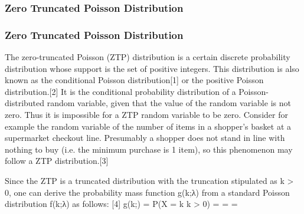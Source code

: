 \begin{frame}
\frametitle{Zero Truncated Poisson Distribution}
\Large


\end{frame}
\begin{frame}
\frametitle{Zero Truncated Poisson Distribution}
\Large

The zero-truncated Poisson (ZTP) distribution is a certain discrete probability distribution whose support is the set of positive integers. This distribution is also known as the conditional Poisson distribution[1] or the positive Poisson distribution.[2] It is the conditional probability distribution of a Poisson-distributed random variable, given that the value of the random variable is not zero. Thus it is impossible for a ZTP random variable to be zero. Consider for example the random variable of the number of items in a shopper's basket at a supermarket checkout line. Presumably a shopper does not stand in line with nothing to buy (i.e. the minimum purchase is 1 item), so this phenomenon may follow a ZTP distribution.[3]

\end{frame}
\begin{frame}

Since the ZTP is a truncated distribution with the truncation stipulated as k > 0, one can derive the probability mass 
function g(k;λ) from a standard Poisson distribution f(k;λ) as follows: [4]
g(k;\lambda) = P(X = k \mid k > 0) = 
 = 
 = 

\end{frame}

